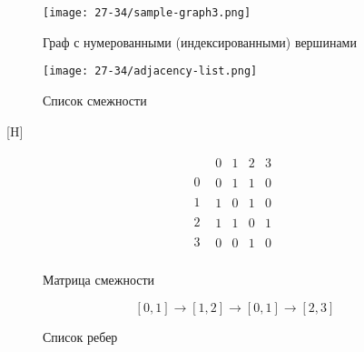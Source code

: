\begin{figure}[H]
\begin{center}
  \texttt{[image: 27-34/sample-graph3.png]}
  \caption{Граф с нумерованными (индексированными) вершинами}
  \label{fig:graph}
\end{center}
\end{figure}
\begin{figure}[H]
\begin{center}
  \texttt{[image: 27-34/adjacency-list.png]}
  \caption{Список смежности}
  \label{fig:adj-list}
\end{center}
\end{figure}[H]
\begin{figure}
  {\large $$ \begin{array}{c|c}
      & \begin{matrix} 0 & 1 & 2 & 3 \end{matrix} \\\hline
    0 & \begin{matrix} 0 & 1 & 1 & 0 \end{matrix} \\
    1 & \begin{matrix} 1 & 0 & 1 & 0 \end{matrix} \\
    2 & \begin{matrix} 1 & 1 & 0 & 1 \end{matrix} \\
    3 & \begin{matrix} 0 & 0 & 1 & 0 \end{matrix} \\
  \end{array} $$}
  \caption{Матрица смежности}
  \label{fig:adj-mat}
\end{figure}
\begin{figure}
  \begin{center}
    $$[0, 1]\rightarrow[1, 2]\rightarrow[0, 1]\rightarrow[2, 3]$$
  \end{center}
  \caption{Список ребер}
  \label{fig:edg-list}
\end{figure}


